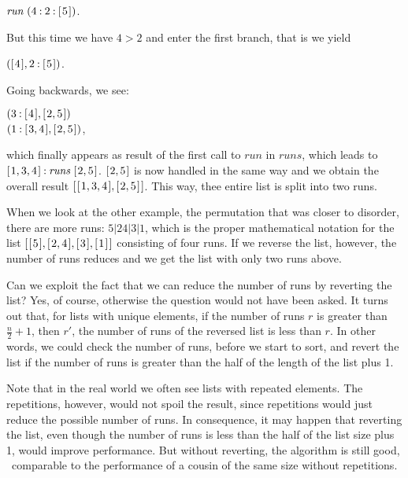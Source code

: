\documentclass{scrreprt}
\newcommand{\Varid}[1]{\mathit{#1}}
\begin{document}
\ensuremath{\Varid{run}\;(\mathrm{4}\mathbin{:}\mathrm{2}\mathbin{:}[\mskip1.5mu \mathrm{5}\mskip1.5mu])}.

But this time we have $4 > 2$ and enter
the first branch, that is we yield

\ensuremath{([\mskip1.5mu \mathrm{4}\mskip1.5mu],\mathrm{2}\mathbin{:}[\mskip1.5mu \mathrm{5}\mskip1.5mu])}.

Going backwards, we see:

\ensuremath{(\mathrm{3}\mathbin{:}[\mskip1.5mu \mathrm{4}\mskip1.5mu],[\mskip1.5mu \mathrm{2},\mathrm{5}\mskip1.5mu])}\\
\ensuremath{(\mathrm{1}\mathbin{:}[\mskip1.5mu \mathrm{3},\mathrm{4}\mskip1.5mu],[\mskip1.5mu \mathrm{2},\mathrm{5}\mskip1.5mu])},

which finally appears as result
of the first call to \ensuremath{\Varid{run}} in \ensuremath{\Varid{runs}},
which leads to \ensuremath{[\mskip1.5mu \mathrm{1},\mathrm{3},\mathrm{4}\mskip1.5mu]\mathbin{:}\Varid{runs}\;[\mskip1.5mu \mathrm{2},\mathrm{5}\mskip1.5mu]}.
\ensuremath{[\mskip1.5mu \mathrm{2},\mathrm{5}\mskip1.5mu]} is now handled in the same way
and we obtain the overall result \ensuremath{[\mskip1.5mu [\mskip1.5mu \mathrm{1},\mathrm{3},\mathrm{4}\mskip1.5mu],[\mskip1.5mu \mathrm{2},\mathrm{5}\mskip1.5mu]\mskip1.5mu]}.
This way, thee entire list is split into two runs.

When we look at the other example,
the permutation that was closer to disorder,
there are more runs: $5|24|3|1$,
which is the proper mathematical notation
for the list \ensuremath{[\mskip1.5mu [\mskip1.5mu \mathrm{5}\mskip1.5mu],[\mskip1.5mu \mathrm{2},\mathrm{4}\mskip1.5mu],[\mskip1.5mu \mathrm{3}\mskip1.5mu],[\mskip1.5mu \mathrm{1}\mskip1.5mu]\mskip1.5mu]}
consisting of four runs.
If we reverse the list, however,
the number of runs reduces and 
we get the list with only two runs above.

Can we exploit the fact that we can reduce
the number of runs by reverting the list?
Yes, of course, otherwise the question
would not have been asked.
It turns out that, 
for lists with unique elements,
if the number of runs $r$ is greater
than $\frac{n}{2} + 1$, then
$r'$, the number of runs of the reversed list
is less than $r$.
In other words, we could check the number of runs,
before we start to sort, and revert the list
if the number of runs is greater than 
the half of the length of the list plus 1.

Note that in the real world
we often see lists with repeated elements.
The repetitions, however, would not spoil the result,
since repetitions would just reduce
the possible number of runs. In consequence,
it may happen that reverting the list,
even though the number of runs is less
than the half of the list size plus 1, would 
improve performance. But without reverting,
the algorithm is still good, \viz\ comparable
to the performance of a cousin of the same size
without repetitions.
\end{document}
